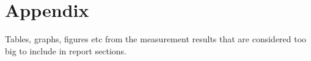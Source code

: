 \section{Appendix}
Tables, graphs, figures etc from the measurement results that are considered too big to include in report sections. 

